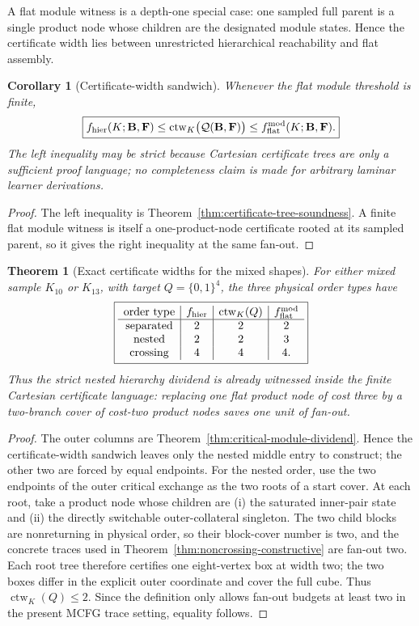 \documentclass[11pt]{article}
\newtheorem{theorem}[definition]{Theorem}
\newtheorem{corollary}[definition]{Corollary}
\begin{document}
A flat module witness is a depth-one special case: one sampled full parent is a
single product node whose children are the designated module states.  Hence the
certificate width lies between unrestricted hierarchical reachability and flat
assembly.

\begin{corollary}[Certificate-width sandwich]
\label{cor:certificate-width-sandwich}
Whenever the flat module threshold is finite,
\[
 \boxed{
 f_{\rm hier}(K;\mathbf B,\mathbf F)
 \le
 \operatorname{ctw}_K\bigl(\mathcal Q(\mathbf B,\mathbf F)\bigr)
 \le
 f_{\rm flat}^{\rm mod}(K;\mathbf B,\mathbf F).
 }
\]
The left inequality may be strict because Cartesian certificate trees are only
a sufficient proof language; no completeness claim is made for arbitrary
laminar learner derivations.
\end{corollary}

\begin{proof}
The left inequality is Theorem~\ref{thm:certificate-tree-soundness}.  A finite
flat module witness is itself a one-product-node certificate rooted at its
sampled parent, so it gives the right inequality at the same fan-out.
\end{proof}

\begin{theorem}[Exact certificate widths for the mixed shapes]
\label{thm:mixed-certificate-widths}
For either mixed sample $K_{10}$ or $K_{13}$, with target
$Q=\{0,1\}^4$, the three physical order types have
\[
 \boxed{
 \begin{array}{c|c|c|c}
 \text{order type}&f_{\rm hier}&\operatorname{ctw}_K(Q)&f_{\rm flat}^{\rm mod}\\
 \hline
 \text{separated}&2&2&2\\
 \text{nested}&2&2&3\\
 \text{crossing}&4&4&4.
 \end{array}}
\]
Thus the strict nested hierarchy dividend is already witnessed inside the
finite Cartesian certificate language: replacing one flat product node of
cost three by a two-branch cover of cost-two product nodes saves one unit of
fan-out.
\end{theorem}

\begin{proof}
The outer columns are Theorem~\ref{thm:critical-module-dividend}.  Hence the
certificate-width sandwich leaves only the nested middle entry to construct;
the other two are forced by equal endpoints.  For the nested order, use the
two endpoints of the outer critical exchange as the two roots of a start
cover.  At each root, take a product node whose children are (i) the saturated
inner-pair state and (ii) the directly switchable outer-collateral singleton.
The two child blocks are nonreturning in physical order, so their block-cover
number is two, and the concrete traces used in
Theorem~\ref{thm:noncrossing-constructive} are fan-out two.  Each root tree
therefore certifies one eight-vertex box at width two; the two boxes differ in
the explicit outer coordinate and cover the full cube.  Thus
$\operatorname{ctw}_K(Q)\le2$.  Since the definition only allows fan-out
budgets at least two in the present MCFG trace setting, equality follows.
\end{proof}
\end{document}
